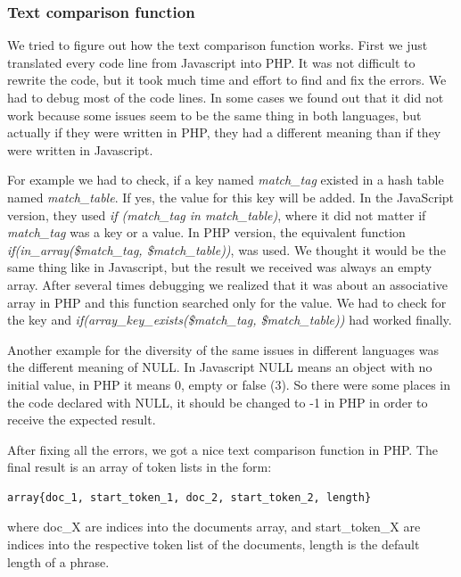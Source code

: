 \subsubsection{Text comparison function}

We tried to figure out how the text comparison function works. First we just translated every code line from Javascript into PHP. It was not difficult to rewrite the code, but it took much time and effort to find and fix the errors. We had to debug most of  the code lines. In some cases we found out that it did not work because some issues seem to be the same thing in both languages, but actually if they were written in PHP, they had a different meaning than if they were written in Javascript.

For example we had to check, if a key named \textit{match\_tag} existed in a hash table named \textit{match\_table}. If yes, the value for this key will be added. In the JavaScript version, they used \textit{if (match\_tag in match\_table)}, where it did not matter if \textit{match\_tag} was a key or a value. In PHP version, the equivalent function \textit{if(in\_array(\$match\_tag, \$match\_table))}, was used. We thought it would be the same thing like in Javascript, but the result we received was always an empty array. After several times debugging we realized that it was about an associative array in PHP and this function searched only for the value. We had to check for the key and \textit{if(array\_key\_exists(\$match\_tag, \$match\_table))} had worked finally.

Another example for the diversity of the same issues in different languages was the different meaning of NULL. In Javascript NULL means an object with no initial value, in PHP it means 0, empty or false (3). So there were some places in the code declared with NULL, it should be changed to -1 in PHP in order to receive the expected result. 

After fixing all the errors, we got a nice text comparison function in PHP. The final result is an array of token lists in the form:

\begin{lstlisting}[caption=Cropping an image to a square aspect ratio]
array{doc_1, start_token_1, doc_2, start_token_2, length} 
\end{lstlisting}

where doc\_X are indices into the documents array, and start\_token\_X are indices into the respective token list of the documents, length is the default length of a phrase. 

